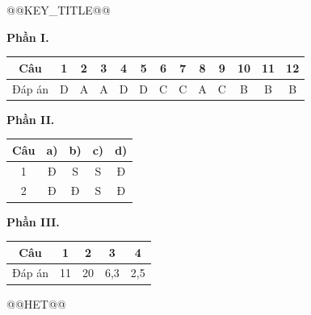 \documentclass{article}
\begin{document}
@@KEY_TITLE@@

\textbf{Phần I.}

\begin{tabular}{|c|c|c|c|c|c|c|c|c|c|c|c|c|}\hline
Câu & 1 & 2 & 3 & 4 & 5 & 6 & 7 & 8 & 9 & 10 & 11 & 12 \\ \hline
Đáp án & D & A & A & D & D & C & C & A & C & B & B & B \\ \hline
\end{tabular}

\textbf{Phần II.}

\begin{tabular}{|c|c|c|c|c|}\hline
Câu & a) & b) & c) & d) \\ \hline
1 & Đ & S & S & Đ \\ \hline
2 & Đ & Đ & S & Đ \\ \hline
\end{tabular}

\textbf{Phần III.}

\begin{tabular}{|c|c|c|c|c|}\hline
Câu & 1 & 2 & 3 & 4 \\ \hline
Đáp án & 11 & 20 & 6,3 & 2,5 \\ \hline
\end{tabular}



@@HET@@
\end{document}
